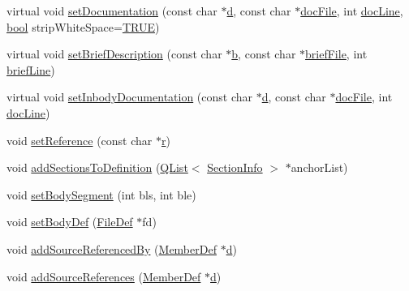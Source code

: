 \begin{DoxyCompactItemize}
\item 
virtual void \hyperlink{class_definition_af13e2148f395d2704535e52f50ccc418}{set\+Documentation} (const char $\ast$\hyperlink{060__command__switch_8tcl_af43f4b1f0064a33b2d662af9f06d3a00}{d}, const char $\ast$\hyperlink{class_definition_a7c5f8f793b451b8e9bbc68b40a9e8faa}{doc\+File}, int \hyperlink{class_definition_a1eddb1e4af4660518113a159e76ca983}{doc\+Line}, \hyperlink{qglobal_8h_a1062901a7428fdd9c7f180f5e01ea056}{bool} strip\+White\+Space=\hyperlink{qglobal_8h_a04a6422a52070f0dc478693da640242b}{T\+R\+U\+E})
\item 
virtual void \hyperlink{class_definition_a5f6f7e25d740acb612b57365f9fccfc2}{set\+Brief\+Description} (const char $\ast$\hyperlink{060__command__switch_8tcl_a68bdb74c144118d936931c46f75d4b3e}{b}, const char $\ast$\hyperlink{class_definition_a3c37121dca58fcb1c3d499b52e0a70fd}{brief\+File}, int \hyperlink{class_definition_a26799d5c03900e931fb1382a5aa56bdd}{brief\+Line})
\item 
virtual void \hyperlink{class_definition_a829959b92985d0264b9fc17277bf91b4}{set\+Inbody\+Documentation} (const char $\ast$\hyperlink{060__command__switch_8tcl_af43f4b1f0064a33b2d662af9f06d3a00}{d}, const char $\ast$\hyperlink{class_definition_a7c5f8f793b451b8e9bbc68b40a9e8faa}{doc\+File}, int \hyperlink{class_definition_a1eddb1e4af4660518113a159e76ca983}{doc\+Line})
\item 
void \hyperlink{class_definition_a9548c1e2218ce2730c6c3e31bdac6452}{set\+Reference} (const char $\ast$\hyperlink{060__command__switch_8tcl_a0a0bd3dc69dd06934c4e6362155e0ace}{r})
\item 
void \hyperlink{class_definition_a2314524366e46c9d0cd8bcb528d6238d}{add\+Sections\+To\+Definition} (\hyperlink{class_q_list}{Q\+List}$<$ \hyperlink{struct_section_info}{Section\+Info} $>$ $\ast$anchor\+List)
\item 
void \hyperlink{class_definition_a7c5466b95c0544781c25c93d3ed8a543}{set\+Body\+Segment} (int bls, int ble)
\item 
void \hyperlink{class_definition_a11177a4416320b6dd561b314d02c607a}{set\+Body\+Def} (\hyperlink{class_file_def}{File\+Def} $\ast$fd)
\item 
void \hyperlink{class_definition_a06d25c9164855c20278be38829e2d72e}{add\+Source\+Referenced\+By} (\hyperlink{class_member_def}{Member\+Def} $\ast$\hyperlink{060__command__switch_8tcl_af43f4b1f0064a33b2d662af9f06d3a00}{d})
\item 
void \hyperlink{class_definition_a153cd19977164802044d4602ee212aa3}{add\+Source\+References} (\hyperlink{class_member_def}{Member\+Def} $\ast$\hyperlink{060__command__switch_8tcl_af43f4b1f0064a33b2d662af9f06d3a00}{d})

\end{DoxyCompactItemize}

